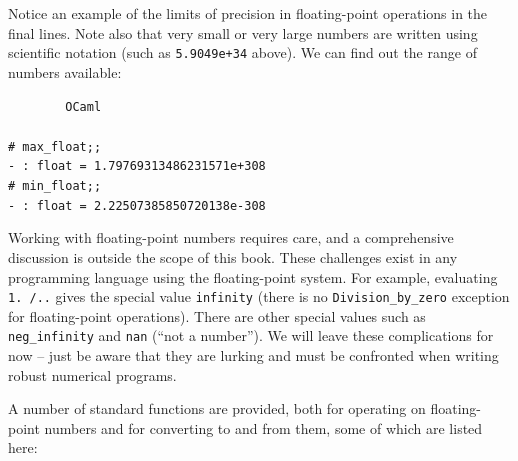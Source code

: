 \documentclass[]{book}
\newcommand{\smspace}{\vspace{4mm}}
\begin{document}
\noindent Notice an example of the limits of precision in floating-point operations in the final lines. Note also that very small or very large numbers are written using scientific notation (such as \texttt{5.9049e+34} above). We can find out the range of numbers available:

\smspace
\noindent\verb!        OCaml!\\
\noindent\\
\verb!# max_float;;!\\
\verb!- : float = 1.79769313486231571e+308!\\
\verb!# min_float;;!\\
\verb!- : float = 2.22507385850720138e-308!\vphantom{g}
\smspace

\noindent Working with floating-point numbers requires care, and a comprehensive discussion is outside the scope of this book. These challenges exist in any programming language using the floating-point system. For example, evaluating \texttt{1.\!\!\!\!\! /.\!\!\!\!.}\! gives the special value \texttt{infinity} (there is no \texttt{Division\_by\_zero} exception for floating-point operations). There are other special values such as \verb!neg_infinity! and \verb!nan! (``not a number''). We will leave these complications for now -- just be aware that they are lurking and must be confronted when writing robust numerical programs.

A number of standard functions are provided, both for operating on floating-point numbers and for converting to and from them, some of which are listed here:
\end{document}
